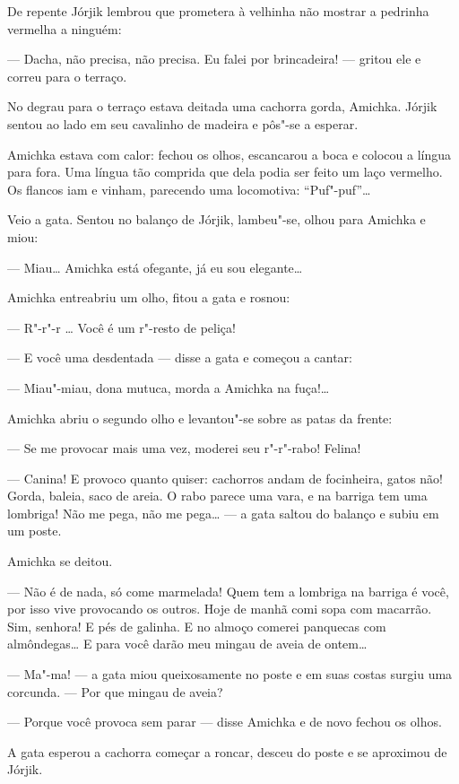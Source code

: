 De repente Jórjik lembrou que prometera à velhinha não mostrar a
pedrinha vermelha a ninguém:

--- Dacha, não precisa, não precisa. Eu falei por brincadeira! ---
gritou ele e correu para o terraço.

No degrau para o terraço estava deitada uma cachorra gorda, Amichka.
Jórjik sentou ao lado em seu cavalinho de madeira e pôs"-se a esperar.

Amichka estava com calor: fechou os olhos, escancarou a boca e colocou a
língua para fora. Uma língua tão comprida que dela podia ser feito um
laço vermelho. Os flancos iam e vinham, parecendo uma locomotiva:
``Puf"-puf''\ldots{}

Veio a gata. Sentou no balanço de Jórjik, lambeu"-se, olhou para Amichka
e miou:

--- Miau\ldots{} Amichka está ofegante, já eu sou elegante\ldots{}

Amichka entreabriu um olho, fitou a gata e rosnou:

--- R"-r"-r \ldots{} Você é um r"-resto de peliça!

--- E você uma desdentada --- disse a gata e começou a cantar:

--- Miau"-miau, dona mutuca, morda a Amichka na fuça!\ldots{}

Amichka abriu o segundo olho e levantou"-se sobre as patas da frente:

--- Se me provocar mais uma vez, moderei seu r"-r"-rabo! Felina!

--- Canina! E provoco quanto quiser: cachorros andam de focinheira,
gatos não! Gorda, baleia, saco de areia. O rabo parece uma vara, e na
barriga tem uma lombriga! Não me pega, não me pega\ldots{} --- a gata saltou
do balanço e subiu em um poste.

Amichka se deitou.

--- Não é de nada, só come marmelada! Quem tem a lombriga na barriga é
você, por isso vive provocando os outros. Hoje de manhã comi sopa com
macarrão. Sim, senhora! E pés de galinha. E no almoço comerei panquecas
com almôndegas\ldots{} E para você darão meu mingau de aveia de ontem\ldots{}

--- Ma"-ma! --- a gata miou queixosamente no poste e em suas costas
surgiu uma corcunda. --- Por que mingau de aveia?

--- Porque você provoca sem parar --- disse Amichka e de novo fechou os
olhos.

A gata esperou a cachorra começar a roncar, desceu do poste e se
aproximou de Jórjik.


